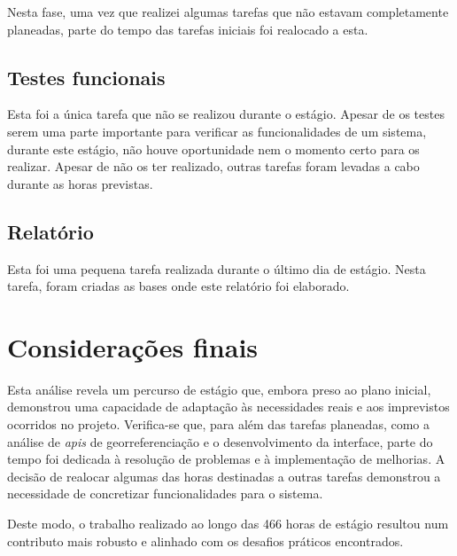 Nesta fase, uma vez que realizei algumas tarefas que não estavam completamente planeadas, parte do tempo das tarefas iniciais foi realocado a esta.

\vspace{0.5cm}
\subsection{Testes funcionais}
Esta foi a única tarefa que não se realizou durante o estágio. Apesar de os testes serem uma parte importante para verificar as funcionalidades de um sistema, durante este estágio, não houve oportunidade nem o momento certo para os realizar. Apesar de não os ter realizado, outras tarefas foram levadas a cabo durante as horas previstas.

\vspace{0.5cm}
\subsection{Relatório}
Esta foi uma pequena tarefa realizada durante o último dia de estágio. Nesta tarefa, foram criadas as bases onde este relatório foi elaborado.

\section{Considerações finais}
Esta análise revela um percurso de estágio que, embora preso ao plano inicial, demonstrou uma capacidade de adaptação às necessidades reais e aos imprevistos ocorridos no projeto. Verifica-se que, para além das tarefas planeadas, como a análise de \textit{\acs{api}s} de georreferenciação e o desenvolvimento da interface, parte do tempo foi dedicada à resolução de problemas e à implementação de melhorias. A decisão de realocar algumas das horas destinadas a outras tarefas demonstrou a necessidade de concretizar funcionalidades para o sistema.

Deste modo, o trabalho realizado ao longo das 466 horas de estágio resultou num contributo mais robusto e alinhado com os desafios práticos encontrados.
